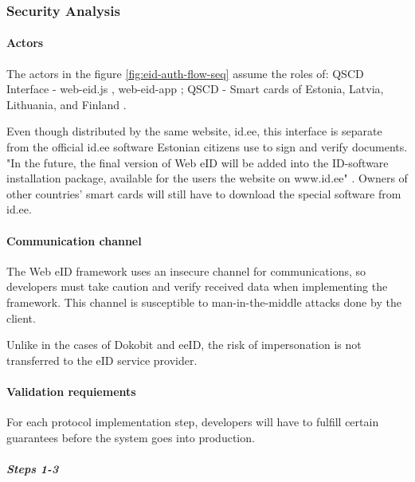 \subsubsection{Security Analysis}

\paragraph{Actors}

The actors in the figure \ref{fig:eid-auth-flow-seq} assume the roles of: QSCD Interface - web-eid.js \cite{ria-webeid-source-web-eid-js}, web-eid-app \cite{ria-webeid-source-web-eid-app}; QSCD - Smart cards of Estonia, Latvia, Lithuania, and Finland \cite{ria-webeid}.

Even though distributed by the same website, id.ee, this interface is separate from the official id.ee software Estonian citizens use to sign and verify documents. "In the future, the final version of Web eID will be added into the ID-software installation package, available for the users the website on www.id.ee" \cite{ria-webeid}. Owners of other countries' smart cards will still have to download the special software from id.ee.

\paragraph{Communication channel}

The Web eID framework uses an insecure channel for communications, so developers must take caution and verify received data when implementing the framework. This channel is susceptible to man-in-the-middle attacks done by the client.

Unlike in the cases of Dokobit and eeID, the risk of impersonation is not transferred to the eID service provider.

\paragraph{Validation requiements}

For each protocol implementation step, developers will have to fulfill certain guarantees before the system goes into production.

\subparagraph{Steps 1-3}

